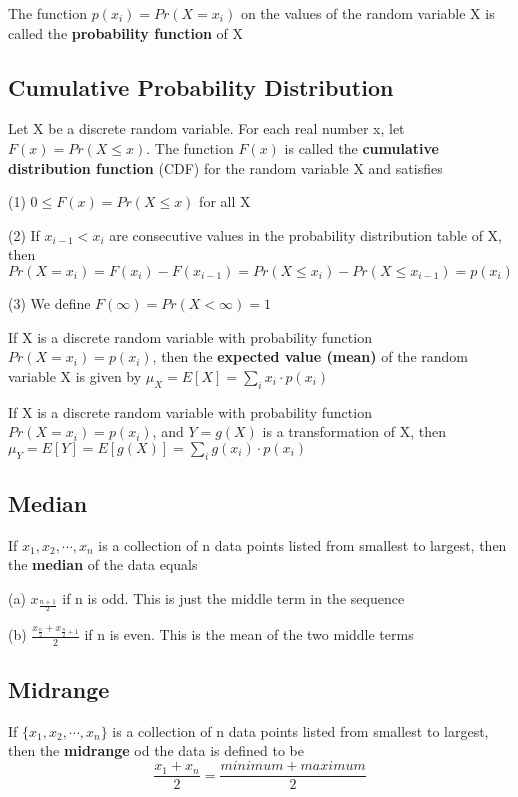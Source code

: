 \documentclass[12pt]{article}
\begin{document}
\begin{spacing}{2.0}
The function $p(x_i)= Pr(X=x_i)$ on the values of the random variable X is called the \textbf{probability function} of X

\subsection{Cumulative Probability Distribution}

Let X be a discrete random variable. For each real number x, let $F(x)= Pr(X \le x)$. The function $F(x)$ is called the \textbf{cumulative distribution function} (CDF) for the random variable X and satisfies

(1) $0 \le F(x) = Pr(X \le x)$ for all X

(2) If $x_{i-1} < x_i$ are consecutive values in the probability distribution table of X, then $Pr(X=x_i)= F(x_i)-F(x_{i-1}) = Pr(X \le x_i) - Pr(X \le x_{i-1}) = p(x_i)$

(3) We define $F(\infty)= Pr(X< \infty) =1$

If X is a discrete random variable with probability function $Pr(X=x_i)=p(x_i)$, then the \textbf{expected value (mean)} of the random variable X is given by $\mu_X = E[X] = \sum\limits_{i} x_i \cdot p(x_i)$

If X is a discrete random variable with probability function $Pr(X=x_i)=p(x_i)$, and $Y=g(X)$ is a transformation of X, then $\mu_Y= E[Y]= E[g(X)]= \sum\limits_{i} g(x_i) \cdot p(x_i)$

\subsection{Median}

If $x_1,x_2, \cdots, x_n$ is a collection of n data points listed from smallest to largest, then the \textbf{median} of the data equals

(a) $x_{\frac{n+1}{2}}$ if n is odd. This is just the middle term in the sequence

(b) $\frac{x_{\frac{n}{2}}+x_{\frac{n}{2}+1}}{2}$ if n is even. This is the mean of the two middle terms

\subsection{Midrange}

If $\{ x_1,x_2, \cdots, x_n \}$ is a collection of n data points listed from smallest to largest, then the \textbf{midrange} od the data is defined to be $$\frac{x_1+x_n}{2}= \frac{minimum+maximum}{2}$$


\end{spacing}
\end{document}
